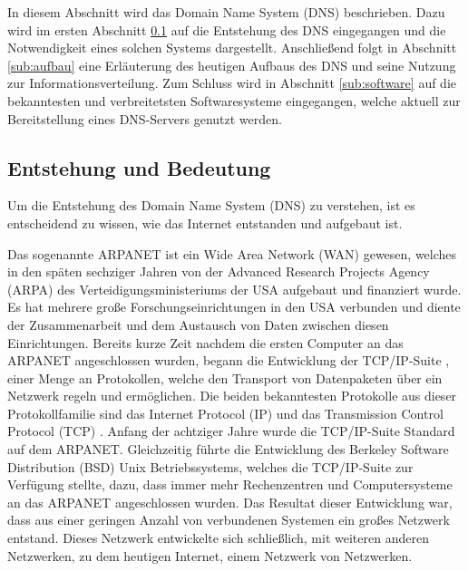\documentclass[a4paper, 12pt, BCOR10mm, DIV12, toc=bibliography, toc=listof, german]{scrbook}
\def \dns {Domain Name System (DNS)}
\begin{document}
		In diesem Abschnitt wird das \dns{} \cite{rfc1034,rfc1035} beschrieben. Dazu wird im ersten
		Abschnitt \ref{sub:entstehung} auf die Entstehung des DNS eingegangen und die Notwendigkeit
		eines solchen Systems dargestellt.  Anschließend folgt in Abschnitt \ref{sub:aufbau} eine
		Erläuterung des heutigen Aufbaus des DNS und seine Nutzung zur Informationsverteilung.
		Zum Schluss wird in Abschnitt \ref{sub:software} auf die bekanntesten und verbreitetsten
		Softwaresysteme eingegangen, welche aktuell zur Bereitstellung eines DNS-Servers genutzt werden.

			\subsection{Entstehung und Bedeutung} %
			\label{sub:entstehung}

			Um die Entstehung des \dns{} zu verstehen, ist es entscheidend zu wissen, wie das Internet
			entstanden und aufgebaut ist.

			Das sogenannte ARPANET ist ein Wide Area Network (WAN) gewesen, welches in den späten
			sechziger Jahren von der Advanced Research Projects Agency (ARPA) des
			Verteidigungsministeriums der USA aufgebaut und finanziert wurde. Es hat mehrere große
			Forschungseinrichtungen in den USA verbunden und diente der Zusammenarbeit und dem Austausch
			von Daten zwischen diesen Einrichtungen. Bereits kurze Zeit nachdem die ersten Computer an
			das ARPANET angeschlossen wurden, begann die Entwicklung der TCP/IP-Suite \cite{stevens1994},
			einer Menge an Protokollen, welche den Transport von Datenpaketen über ein Netzwerk regeln
			und ermöglichen.  Die beiden bekanntesten Protokolle aus dieser Protokollfamilie sind das
			Internet Protocol (IP) \cite{rfc791} und das Transmission Control Protocol (TCP)
			\cite{rfc793}. Anfang der achtziger Jahre wurde die TCP/IP-Suite Standard auf dem ARPANET.
			Gleichzeitig führte die Entwicklung des Berkeley Software Distribution (BSD) Unix
			Betriebssystems, welches die TCP/IP-Suite zur Verfügung stellte, dazu, dass immer mehr
			Rechenzentren und Computersysteme an das ARPANET angeschlossen wurden. Das Resultat dieser Entwicklung
			war, dass aus einer geringen Anzahl von verbundenen Systemen ein großes Netzwerk
			entstand. Dieses Netzwerk entwickelte sich schließlich, mit weiteren anderen Netzwerken, zu
			dem heutigen Internet, einem Netzwerk von Netzwerken.
\end{document}

